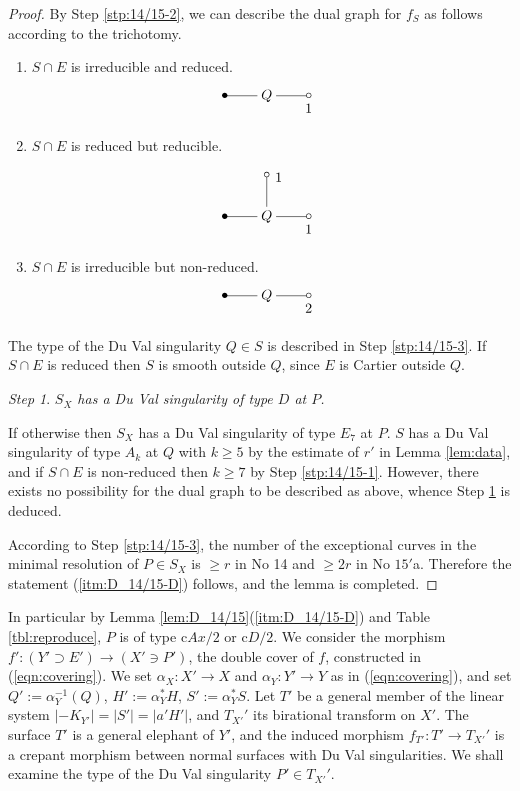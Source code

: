 \documentclass[a4paper,11pt]{amsart}
\theoremstyle{definition}
\theoremstyle{remark}
\newtheorem{step}{Step}
\numberwithin{equation}{section}
\newcommand{\system}[1]{\left|{#1}\right|}
\begin{document}
\begin{proof}
By Step \ref{stp:14/15-2},
we can describe the dual graph for $f_S$ as follows
according to the trichotomy.
\begin{enumerate}
\item
$S \cap E$ is irreducible and reduced.
\begin{align*}
\xymatrix@!0@=30pt{
*=<3.5pt>{\bullet} \ar@{-}[r] &
Q \ar@{-}[r]_>*+{\ 1} &
*=<3.5pt>{\circ}
}
\end{align*}
\item
$S \cap E$ is reduced but reducible.
\begin{align*}
\xymatrix@!0@=30pt{
*=<3.5pt>{} &
*=<3.5pt>{\circ} \ar@{-}[d]^<*+{1} &
\\
*=<3.5pt>{\bullet} \ar@{-}[r] &
Q \ar@{-}[r]_>*+{\ 1} &
*=<3.5pt>{\circ}
}
\end{align*}
\item
$S \cap E$ is irreducible but non-reduced.
\begin{align*}
\xymatrix@!0@=30pt{
*=<3.5pt>{\bullet} \ar@{-}[r] &
Q \ar@{-}[r]_>*+{\ 2} &
*=<3.5pt>{\circ}
}
\end{align*}
\end{enumerate}
The type of the Du Val singularity $Q \in S$ is described
in Step \ref{stp:14/15-3}.
If $S \cap E$ is reduced then $S$ is smooth outside $Q$,
since $E$ is Cartier outside $Q$.

\begin{step}\label{stp:14/15-4}
\itshape
$S_X$ has a Du Val singularity of type $D$ at $P$.
\end{step}

If otherwise then $S_X$ has a Du Val singularity of type $E_7$ at $P$.
$S$ has a Du Val singularity of type $A_k$ at $Q$
with $k \ge 5$ by the estimate of $r'$ in Lemma \ref{lem:data},
and if $S \cap E$ is non-reduced then $k\ge7$ by Step \ref{stp:14/15-1}.
However,
there exists no possibility for the dual graph to be described as above,
whence Step \ref{stp:14/15-4} is deduced.

According to Step \ref{stp:14/15-3},
the number of the exceptional curves in the minimal resolution of $P \in S_X$
is $\ge r$ in No 14 and $\ge 2r$ in No $\textrm{15}'$a.
Therefore the statement (\ref{itm:D_14/15-D}) follows,
and the lemma is completed.
\setcounter{step}{0}
\end{proof}

In particular
by Lemma \ref{lem:D_14/15}(\ref{itm:D_14/15-D}) and Table \ref{tbl:reproduce},
$P$ is of type c$Ax/2$ or c$D/2$.
We consider the morphism $f' \colon (Y' \supset E') \to (X' \ni P')$,
the double cover of $f$, constructed in (\ref{eqn:covering}).
We set $\alpha_X \colon X' \to X$ and $\alpha_Y \colon Y' \to Y$
as in (\ref{eqn:covering}),
and set $Q':=\alpha_Y^{-1}(Q)$, $H':=\alpha_Y^*H$, $S':=\alpha_Y^*S$.
Let $T'$ be a general member of the linear system
$\system{-K_{Y'}}=\system{S'}=\system{a'H'}$,
and $T_{X'}'$ its birational transform on $X'$.
The surface $T'$ is a general elephant of $Y'$,
and the induced morphism $f_{T'} \colon T' \to T_{X'}'$
is a crepant morphism between normal surfaces with Du Val singularities.
We shall examine the type of the Du Val singularity $P' \in T_{X'}'$.
\end{document}

